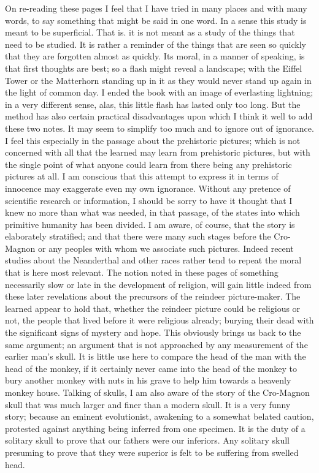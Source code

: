 On re-reading these pages I feel that I have tried in many places and with many words, to say something that might be said in one word. In a sense this study is meant to be superficial. That is. it is not meant as a study of the things that need to be studied. It is rather a reminder of the things that are seen so quickly that they are forgotten almost as quickly. Its moral, in a manner of speaking, is that first thoughts are best; so a flash might reveal a landscape; with the Eiffel Tower or the Matterhorn standing up in it as they would never stand up again in the light of common day. I ended the book with an image of everlasting lightning; in a very different sense, alas, this little flash has lasted only too long. But the method has also certain practical disadvantages upon which I think it well to add these two notes. It may seem to simplify too much and to ignore out of ignorance. I feel this especially in the passage about the prehistoric pictures; which is not concerned with all that the learned may learn from prehistoric pictures, but with the single point of what anyone could learn from there being any prehistoric pictures at all. I am conscious that this attempt to express it in terms of innocence may exaggerate even my own ignorance. Without any pretence of scientific research or information, I should be sorry to have it thought that I knew no more than what was needed, in that passage, of the states into which primitive humanity has been divided. I am aware, of course, that the story is elaborately stratified; and that there were many such stages before the Cro-Magnon or any peoples with whom we associate such pictures. Indeed recent studies about the Neanderthal and other races rather tend to repeat the moral that is here most relevant. The notion noted in these pages of something necessarily slow or late in the development of religion, will gain little indeed from these later revelations about the precursors of the reindeer picture-maker. The learned appear to hold that, whether the reindeer picture could be religious or not, the people that lived before it were religious already; burying their dead with the significant signs of mystery and hope. This obviously brings us back to the same argument; an argument that is not approached by any measurement of the earlier man's skull. It is little use here to compare the head of the man with the head of the monkey, if it certainly never came into the head of the monkey to bury another monkey with nuts in his grave to help him towards a heavenly monkey house. Talking of skulls, I am also aware of the story of the Cro-Magnon skull that was much larger and finer than a modern skull. It is a very funny story; because an eminent evolutionist, awakening to a somewhat belated caution, protested against anything being inferred from one specimen. It is the duty of a solitary skull to prove that our fathers were our inferiors. Any solitary skull presuming to prove that they were superior is felt to be suffering from swelled head.


